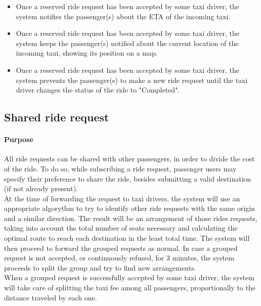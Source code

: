 \begin{itemize}
			\item Once a reserved ride request has been accepted by some taxi driver, the system notifies the passenger(s) about the ETA of the incoming taxi.
			\item Once a reserved ride request has been accepted by some taxi driver, the system keeps the passenger(s) notified about the current location of the incoming taxi, showing its position on a map.
			\item Once a reserved ride request has been accepted by some taxi driver, the system prevents the passenger(s) to make a new ride request until the taxi driver changes the status of the ride to "Completed".
		\end{itemize}

\subsection{Shared ride request}
	\paragraph{Purpose}
		All ride requests can be shared with other passengers, in order to divide the cost of the ride. To do so, while subscribing a ride request, passenger users may specify their preference to share the ride, besides submitting a valid destination (if not already present).\\
		At the time of forwarding the request to taxi drivers, the system will use an appropriate algorythm to try to identify other ride requests with the same origin and a similar direction. The result will be an arrangement of those rides requests, taking into account the total number of seats necessary and calculating the optimal route to reach each destination in the least total time. The system will then proceed to forward the grouped requests as normal. In case a grouped request is not accepted, or continuously refused, for 3 minutes, the system proceeds to split the group and try to find new arrangements.\\
		When a grouped request is successfully accepted by some taxi driver, the system will take care of splitting the taxi fee among all passengers, proportionally to the distance traveled by each one.
	
